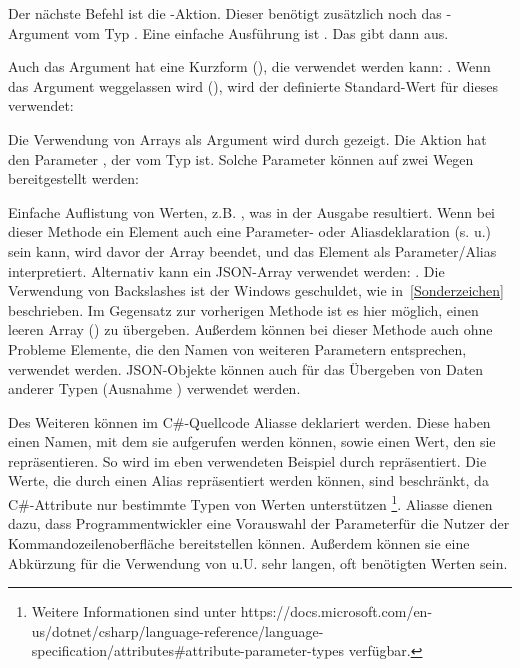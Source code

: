 Der nächste Befehl ist die -Aktion.
Dieser benötigt zusätzlich noch das -Argument vom Typ .
Eine einfache Ausführung ist .
Das gibt dann  aus.

Auch das Argument hat eine Kurzform (), die verwendet werden kann: .
Wenn das Argument weggelassen wird (), wird der definierte Standard-Wert für dieses verwendet:

Die Verwendung von Arrays als Argument wird durch  gezeigt.
Die Aktion hat den Parameter , der vom Typ  ist.
Solche Parameter können auf zwei Wegen bereitgestellt werden:
\begin{outline}
 \1 Einfache Auflistung von Werten, z.B. ,
 was in der Ausgabe  resultiert.
 Wenn bei dieser Methode ein Element auch eine Parameter- oder Aliasdeklaration (s. u.) sein kann, wird davor der Array beendet,
 und das Element als Parameter/Alias interpretiert.
 \1 Alternativ kann ein JSON-Array verwendet werden: .
 Die Verwendung von Backslashes ist der Windows  geschuldet, wie in~\ref{Sonderzeichen} beschrieben.
 Im Gegensatz zur vorherigen Methode ist es hier möglich, einen leeren Array (\inlinecode{[]}) zu übergeben.
 Außerdem können bei dieser Methode auch ohne Probleme Elemente, die den Namen von weiteren Parametern entsprechen, verwendet werden.
 JSON-Objekte können auch für das \"Ubergeben von Daten anderer Typen (Ausnahme ) verwendet werden.
\end{outline}

Des Weiteren können im C\#-Quellcode Aliasse deklariert werden.
Diese haben einen Namen, mit dem sie aufgerufen werden können, sowie einen Wert, den sie repräsentieren.
So wird im eben verwendeten Beispiel  durch  repräsentiert.
Die Werte, die durch einen Alias repräsentiert werden können, sind beschränkt, da C\#-Attribute nur bestimmte Typen von Werten unterstützen
\footnote{Weitere Informationen sind unter https://docs.microsoft.com/en-us/dotnet/csharp/language-reference/language-specification/attributes\#attribute-parameter-types verfügbar.}.
Aliasse dienen dazu, dass Programmentwickler eine Vorauswahl der Parameterfür die Nutzer der Kommandozeilenoberfläche bereitstellen können.
Außerdem können sie eine Abkürzung für die Verwendung von u.U. sehr langen, oft benötigten Werten sein.

